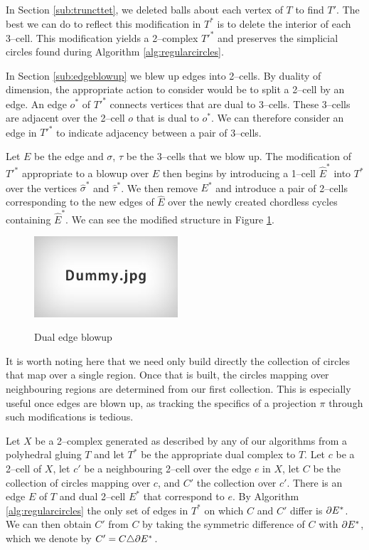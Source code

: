 In Section \ref{sub:truncttet}, we deleted balls about each vertex of $T$ to find $T'$.
The best we can do to reflect this modification in $T^*$ is to delete the interior of each 3--cell.
This modification yields a 2--complex $T'^*$ and preserves the simplicial circles found during Algorithm \ref{alg:regularcircles}.

In Section \ref{sub:edgeblowup} we blew up edges into 2--cells.
By duality of dimension, the appropriate action to consider would be to split a 2--cell by an edge.
An edge $o^*$ of $T'^*$ connects vertices that are dual to 3--cells.
These 3--cells are adjacent over the 2--cell $o$ that is dual to $o^*$.
We can therefore consider an edge in $T'^*$ to indicate adjacency between a pair of 3--cells.

Let $E$ be the edge and $\sigma$, $\tau$ be the 3--cells that we blow up.
The modification of $T'^*$ appropriate to a blowup over $E$ then begins by introducing a 1--cell $\hat{E}^*$ into $T^*$ over the vertices $\hat{\sigma}^*$ and $\hat{\tau}^*$.
We then remove $E^*$ and introduce a pair of 2--cells corresponding to the new edges of $\hat{E}$ over the newly created chordless cycles containing $\hat{E}^*$.
We can see the modified structure in Figure \ref{fig:dualblowup}.

\begin{figure}
	\centering
	\captionsetup{justification=centering}
	\caption{Dual edge blowup}
	\includegraphics[height=3cm]{figures/dummy.jpg}
	\label{fig:dualblowup}
\end{figure}

It is worth noting here that we need only build directly the collection of circles that map over a single region.
Once that is built, the circles mapping over neighbouring regions are determined from our first collection.
This is especially useful once edges are blown up, as tracking the specifics of a projection $\pi$ through such modifications is tedious.

Let $X$ be a 2--complex generated as described by any of our algorithms from a polyhedral gluing $T$ and let $T^*$ be the appropriate dual complex to $T$.
Let $c$ be a 2--cell of $X$, let $c'$ be a neighbouring 2--cell over the edge $e$ in $X$, let $C$ be the collection of circles mapping over $c$, and $C'$ the collection over $c'$.
There is an edge $E$ of $T$ and dual 2--cell $E^*$ that correspond to $e$.
By Algorithm \ref{alg:regularcircles} the only set of edges in $T^*$ on which $C$ and $C'$ differ is $\partial E^*$.
We can then obtain $C'$ from $C$ by taking the symmetric difference of $C$ with $\partial E^*$, which we denote by $C'=C\triangle \partial E^*$.
